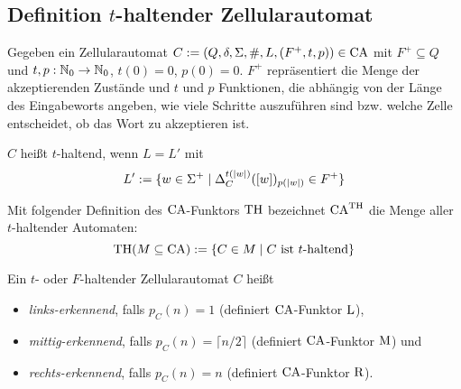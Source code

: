 \subsection{Definition \texorpdfstring{$t$}{t}-haltender Zellularautomat}

\begin{definition}
    Gegeben ein Zellularautomat $C := (Q, \delta, \Sigma, \#, L, (F^+, t, p)) \in \textrm{CA}$
    mit $F^+ \subseteq Q$ und $t, p: \mathbb{N}_0 \to \mathbb{N}_0$, $t(0) = 0$, $p(0) = 0$.
    $F^+$ repräsentiert die Menge der akzeptierenden Zustände und $t$ und $p$ Funktionen,
    die abhängig von der Länge des Eingabeworts angeben,
    wie viele Schritte auszuführen sind \acs{bzw.} welche Zelle entscheidet, ob das Wort zu akzeptieren ist.
    
    $C$ heißt $t$-haltend, wenn $L = L'$ mit
    \[
        L' := \{ { w \in \Sigma^+ } \; | \; { \Delta_C^{t(|w|)}([w])_{p(|w|)} \in F^+ } \}
    \]
    
    Mit folgender Definition des $\textrm{CA}$-Funktors $\textrm{TH}$ bezeichnet $\textrm{CA}^{\textrm{TH}}$ die Menge aller $t$-haltender Automaten:
    \[
        \textrm{TH}(M \subseteq \textrm{CA}) := \{ { C \in M } \; | \; { C \text{ ist $t$-haltend} } \}
    \]
\end{definition}









\begin{definition}
    Ein $t$- oder $F$-haltender Zellularautomat $C$ heißt
    \begin{itemize}
        \item \emph{links-erkennend}, falls $p_C(n) = 1$ (definiert $\textrm{CA}$-Funktor $\textrm{L}$),
        \item \emph{mittig-erkennend}, falls $p_C(n) = \lceil n / 2 \rceil$ (definiert $\textrm{CA}$-Funktor $\textrm{M}$) und
        \item \emph{rechts-erkennend}, falls $p_C(n) = n$ (definiert $\textrm{CA}$-Funktor $\textrm{R}$).
    \end{itemize}
\end{definition}


